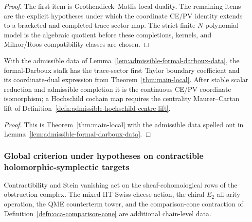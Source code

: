 \begin{proof}
The first item is Grothendieck--Matlis local duality.  The remaining
items are the explicit hypotheses under which the coordinate CE/PV
identity extends to a bracketed and completed trace-sector map.
The strict finite-\(N\) polynomial model is the algebraic quotient
before these completions, kernels, and Milnor/Roos compatibility
classes are chosen.
\end{proof}

\begin{cor}
\label{cor:local-trace-sector-deligne}
With the admissible data of
Lemma~\ref{lem:admissible-formal-darboux-data}, the formal-Darboux stalk
has the trace-sector first Taylor boundary coefficient and its
coordinate-dual expression from
Theorem~\ref{thm:main-local}.  After stable scalar reduction and
admissible completion it is the continuous CE/PV coordinate isomorphism; a
Hochschild cochain map requires the centrality Maurer--Cartan lift
of Definition~\ref{defn:admissible-hochschild-centre-lift}.
\end{cor}

\begin{proof}
This is Theorem~\ref{thm:main-local} with the admissible data
spelled out in Lemma~\ref{lem:admissible-formal-darboux-data}.
\end{proof}

\subsubsection{Global criterion under hypotheses on contractible
holomorphic-symplectic targets}
\label{sssec:global-contractible}

Contractibility and Stein vanishing act on the sheaf-cohomological
rows of the obstruction complex.  The mixed-HT Swiss-cheese action, the
chiral \(E_2\) all-arity operation, the QME counterterm tower, and the
comparison-cone contraction of Definition~\ref{defn:oca-comparison-cone}
are additional chain-level data.

